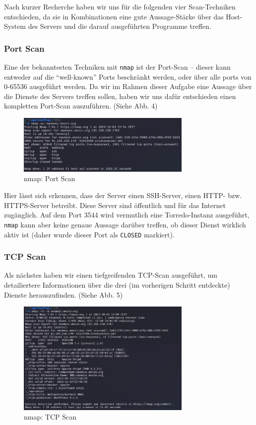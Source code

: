 \documentclass{article}
\begin{document}
Nach kurzer Recherche haben wir uns für die folgenden vier Scan-Techniken entschieden, da sie in 
Kombinationen eine gute Aussage-Stärke über das Host-System des Servers und die darauf ausgeführten
Programme treffen.

\subsubsection*{Port Scan}

Eine der bekanntesten Techniken mit \texttt{nmap} ist der Port-Scan – dieser kann entweder auf die
``well-known'' Ports beschränkt werden, oder über alle ports von 0-65536 ausgeführt werden. Da wir 
im Rahmen dieser Aufgabe eine Aussage über die Dienste des Servers treffen sollen, haben wir uns dafür
entschieden einen kompletten Port-Scan auszuführen. (Siehe Abb. 4)

\begin{figure}[H]
	\includegraphics[width=0.75\textwidth]{images/04}
	\centering
	\caption{nmap: Port Scan}
\end{figure}

Hier lässt sich erkennen, dass der Server einen SSH-Server, einen HTTP- bzw. HTTPS-Server betreibt.
Diese Server sind öffentlich und für das Internet zugänglich. Auf dem Port 3544 wird vermutlich eine
Torredo-Instanz ausgeführt, \texttt{nmap} kann aber keine genaue Aussage darüber treffen, ob dieser
Dienst wirklich aktiv ist (daher wurde dieser Port als \texttt{CLOSED} markiert).

\subsubsection*{TCP Scan}

Als nächstes haben wir einen tiefgreifenden TCP-Scan ausgeführt, um detailiertere Informationen über
die drei (im vorherigen Schritt entdeckte) Dienste herauszufinden. (Siehe Abb. 5)

\begin{figure}[H]
	\includegraphics[width=0.75\textwidth]{images/05}
	\centering
	\caption{nmap: TCP Scan}
\end{figure}
\end{document}
